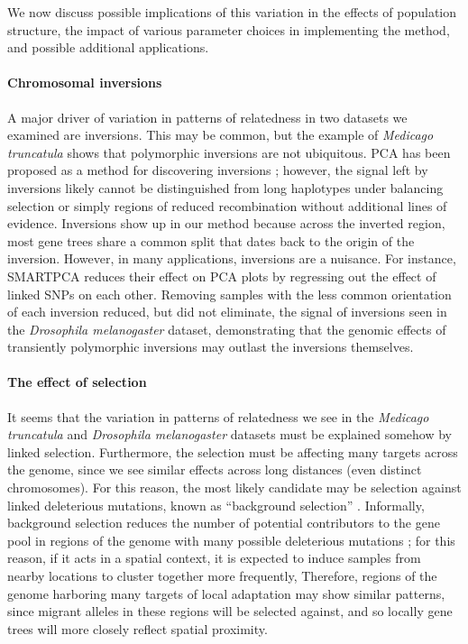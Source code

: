 \documentclass[11pt, oneside]{article}   	%
\newcommand\citep{\cite}
\begin{document}
We now discuss possible implications of this variation in the effects of population structure,
the impact of various parameter choices in implementing the method,
and possible additional applications.


\paragraph{Chromosomal inversions}
A major driver of variation in patterns of relatedness in two datasets we examined are inversions.
This may be common,
but the example of \textit{Medicago truncatula} shows that polymorphic inversions are not ubiquitous.
PCA has been proposed as a method for discovering inversions \citep{ma2012investigation};
however, the signal left by inversions likely cannot be distinguished from long haplotypes under balancing selection 
or simply regions of reduced recombination
without additional lines of evidence.
Inversions show up in our method because across the inverted region,
most gene trees share a common split that dates back to the origin of the inversion.
However, in many applications, inversions are a nuisance.
For instance, SMARTPCA \citep{patterson2006population} reduces their effect on PCA plots
by regressing out the effect of linked SNPs on each other.
Removing samples with the less common orientation of each inversion reduced,
but did not eliminate, the signal of inversions
seen in the \textit{Drosophila melanogaster} dataset,
demonstrating that the genomic effects of transiently polymorphic inversions
may outlast the inversions themselves.


\paragraph{The effect of selection}
It seems that
the variation in patterns of relatedness we see in the \textit{Medicago truncatula} and \textit{Drosophila melanogaster} datasets
must be explained somehow by linked selection.
Furthermore, 
the selection must be affecting many targets across the genome,
since we see similar effects across long distances (even distinct chromosomes).
For this reason, the most likely candidate may be selection against linked deleterious mutations, known as ``background selection'' \citep{charlesworth1993effect,charlesworth2013background}.
Informally, background selection reduces the number of potential contributors to the gene pool 
in regions of the genome with many possible deleterious mutations \citep{hudson1995deleterious};
for this reason, if it acts in a spatial context, it is expected to induce samples from nearby locations to cluster together more frequently,
Therefore, regions of the genome harboring many targets of local adaptation may show similar patterns,
since migrant alleles in these regions will be selected against,
and so locally gene trees will more closely reflect spatial proximity.
\end{document}
